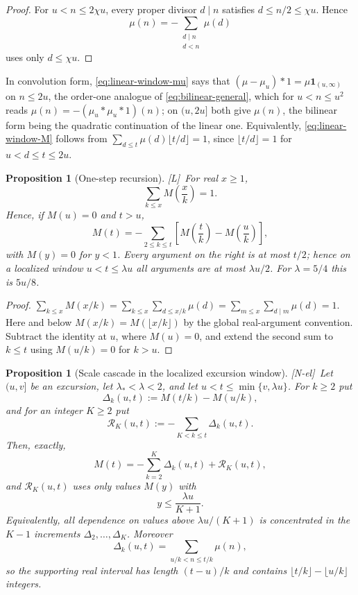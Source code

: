 \documentclass[11pt]{amsart}
\numberwithin{equation}{section}
\theoremstyle{plain}
\newtheorem{proposition}[theorem]{Proposition}
\theoremstyle{definition}
\theoremstyle{remark}
\newcommand{\tagNE}{\textup{[N-el]}}
\newcommand{\tagL}{\textup{[L]}}
\begin{document}
\begin{proof}
For $u<n\le2\chi u$, every proper divisor $d\mid n$ satisfies
$d\le n/2\le\chi u$.  Hence
\[
\mu(n)=-\sum_{\substack{d\mid n\\ d<n}}\mu(d)
\]
uses only $d\le\chi u$.
\end{proof}

In convolution form, \eqref{eq:linear-window-mu} says that
$(\mu-\mu_u)*1=\mu\mathbf 1_{(u,\infty)}$ on $n\le2u$, the order-one analogue
of \eqref{eq:bilinear-general}, which for $u<n\le u^2$ reads
$\mu(n)=-(\mu_u*\mu_u*1)(n)$; on $(u,2u]$ both give $\mu(n)$, the
bilinear form being the quadratic continuation of the linear one. Equivalently, \eqref{eq:linear-window-M}
follows from $\sum_{d\le t}\mu(d)\lfloor t/d\rfloor=1$, since
$\lfloor t/d\rfloor=1$ for $u<d\le t\le2u$.

\begin{proposition}[One-step recursion]
\label{prop:one-step}
\tagL\ For real $x\ge1$,
\begin{equation}
\label{eq:hyperbola-M}
\sum_{k\le x}M\!\left(\frac xk\right)=1 .
\end{equation}
Hence, if $M(u)=0$ and $t>u$,
\begin{equation}
\label{eq:descent-identity}
M(t)=-\sum_{2\le k\le t}\left[M\!\left(\frac tk\right)-M\!\left(\frac uk\right)\right],
\end{equation}
with $M(y)=0$ for $y<1$. Every argument on the right is at most $t/2$; hence on a localized
window $u<t\le\lambda u$ all arguments are at most $\lambda u/2$.  For
$\lambda=5/4$ this is $5u/8$.
\end{proposition}

\begin{proof}
$\sum_{k\le x}M(x/k)=\sum_{k\le x}\sum_{d\le x/k}\mu(d)
=\sum_{m\le x}\sum_{d\mid m}\mu(d)=1$. Here and below
$M(x/k)=M(\lfloor x/k\rfloor)$ by the global real-argument convention.
Subtract the identity at $u$, where $M(u)=0$, and extend the second sum to
$k\le t$ using $M(u/k)=0$ for $k>u$.
\end{proof}

\begin{proposition}[Scale cascade in the localized excursion window]
\label{prop:scale-cascade}
\tagNE\ Let $(u,v]$ be an excursion, let $\lambda_*<\lambda<2$, and let
$u<t\le\min\{v,\lambda u\}$.  For $k\ge2$ put
\[
\Delta_k(u,t):=M(t/k)-M(u/k),
\]
and for an integer $K\ge2$ put
\[
\mathcal R_K(u,t):=-\sum_{K<k\le t}\Delta_k(u,t).
\]
Then, exactly,
\begin{equation}
\label{eq:scale-cascade}
M(t)=-\sum_{k=2}^{K}\Delta_k(u,t)+\mathcal R_K(u,t),
\end{equation}
and $\mathcal R_K(u,t)$ uses only values $M(y)$ with
\[
y\le\frac{\lambda u}{K+1}.
\]
Equivalently, all dependence on values above $\lambda u/(K+1)$ is
concentrated in the $K-1$ increments
$\Delta_2,\ldots,\Delta_K$.  Moreover
\[
\Delta_k(u,t)=\sum_{u/k<n\le t/k}\mu(n),
\]
so the supporting real interval has length $(t-u)/k$ and contains $\lfloor t/k\rfloor-\lfloor u/k\rfloor$ integers.
\end{proposition}
\end{document}
